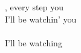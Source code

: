  ,
every step you  \\
I'll be watchin' you \songwordfb{~} \songwordfb{~} \\
\songwordfb{~} \songwordfb{~} \\
I'll be watching

